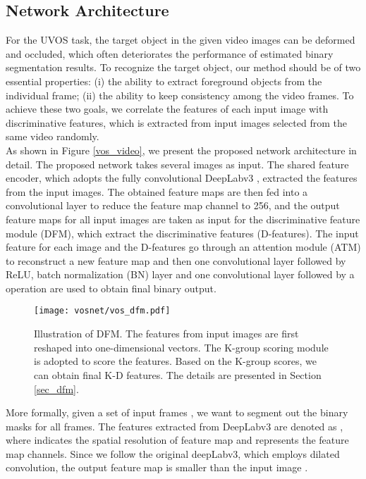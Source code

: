 \documentclass[runningheads]{llncs}
\begin{document}
\subsection{Network Architecture}\label{sec_vos_architecture}
For the UVOS task, the target object in the given video images can be deformed and occluded, which often deteriorates the performance of estimated binary segmentation results. To recognize the target object, our method should be of two essential properties: (i) the ability to extract foreground objects from the individual frame; (ii) the ability to keep consistency among the video frames. To achieve these two goals, we correlate the features of each input image with discriminative features, which is extracted from  input images selected from the same video randomly. \\
\indent As shown in Figure \ref{vos_video}, we present the proposed network architecture in detail. The proposed network takes several images as input. The shared feature encoder, which adopts the fully convolutional DeepLabv3 \cite{deeplabv3}, extracted the features from the input images. The obtained feature maps are then fed into a  convolutional layer to reduce the feature map channel to 256, and the output feature maps for all input images are taken as input for the discriminative feature module (DFM), which extract the discriminative features (D-features).  The input feature for each image and the D-features go through an attention module (ATM) to reconstruct a new feature map and then one  convolutional layer followed by ReLU, batch normalization (BN) layer and one  convolutional layer followed by a  operation are used to obtain final binary output. \\
\begin{figure*}[t!]
	\centering
	\texttt{[image: vosnet/vos\_dfm.pdf]}
	\caption{Illustration of DFM. The features from input images are first reshaped into one-dimensional vectors. The K-group scoring module is adopted to score the features. Based on the K-group scores, we can obtain final K-D features. The details are presented in Section \ref{sec_dfm}.}
	\label{vos_dfm}
\end{figure*}
\indent More formally,  given a set of input frames , we want to segment out the binary masks  for all frames. The features extracted from DeepLabv3 are denoted as , where  indicates the spatial resolution of feature map and  represents the feature map channels. Since we follow the original deepLabv3, which employs dilated convolution, the output feature map  is     smaller than the input image . 
\end{document}
